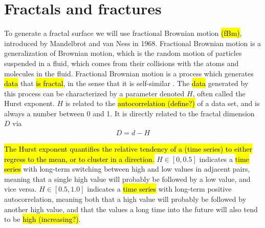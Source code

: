\chapter{Fractals and fractures}
%
%
To generate a fractal surface we will use fractional Brownian motion \hl{(fBm)}, introduced by Mandelbrot and van Ness in 1968\cite{mandelbrot1968fractional}. Fractional Brownian motion is a generalization of Brownian motion, which is the random motion of particles suspended in a fluid, which comes from their collisions with the atoms and molecules in the fluid. Fractional Brownian motion is a process which generates \hl{data} that \hl{is fractal}, in the sense that it is self-similar%
. The \hl{data} generated by this process can be characterized by a parameter denoted $H$, often called the Hurst exponent. $H$ is related to the \hl{autocorrelation (define?)} of a data set, and is always a number between 0 and 1. It is directly related to the fractal dimension $D$ via\cite{feder1988fractals}
\begin{align*}
    D = d - H
\end{align*}

\hl{The Hurst exponent quantifies the relative tendency of a (time series) to either regress to the mean, or to cluster in a direction.} $H\in[0,0.5]$ indicates a \hl{time series} with long-term switching between high and low values in adjacent pairs, meaning that a single high value will probably be followed by a low value, and vice versa. $H\in[0.5,1.0]$ indicates a \hl{time series} with long-term positive autocorrelation, meaning both that a high value will probably be followed by another high value, and that the values a long time into the future will also tend to be \hl{high (increasing?)}.

